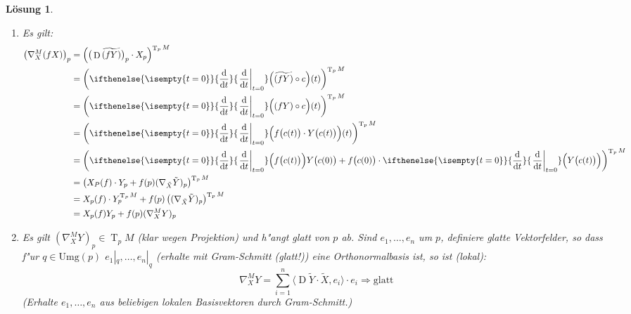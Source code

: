 \documentclass[paper=A4, twoside, chapterprefix=true, bibliography=totoc, headsepline]{scrbook}
\DeclareMathOperator{\D}{D} %
\DeclareMathOperator{\T}{T} %
\newcommand{\dop}{\mathrm{d}}
\newcommand{\difffrac}[3][]{\ifthenelse{\isempty{#1}}{\frac{\dop #2}{\dop #3}}{\left. \frac{\dop #2}{\dop #3} \right|_{#1}}}
\theoremstyle{plain}
\theoremstyle{nonumberplain}
\theoremstyle{empty}
\theoremstyle{break}
\newtheorem{Loes}{L\"osung}
\begin{document}
\begin{Loes}
\begin{enumerate}[label=(\arabic*.\arabic*)]
\begin{align*}
		&= \left( (\D \tilde Y)_p (f(p)X_p) \right)^{\T_pM}\\
		&= f(p) \left( (\D \tilde Y)_p X_p \right)^{\T_pM}\\
		&= f(p) \left( \nabla_X^M Y)_p \right)
	\end{align*}
\item[(2.2)]
	Es gilt:
	\begin{align*}
		\left( \nabla_X^M(fX) \right)_p &= \left( \big(\D\widetilde{(fY)}\big)_p \cdot X_p \right)^{\T_pM}\\
		&= \left( \difffrac[t=0]{}{t} \Big( \widetilde{(fY)} \circ c \Big) (t) \right)^{\T_pM}\\
		&= \left( \difffrac[t=0]{}{t} \Big( (fY) \circ c \Big) (t) \right)^{\T_pM}\\
		&= \left( \difffrac[t=0]{}{t} \Big( f\big(c(t)\big) \cdot Y\big(c(t)\big) \Big) (t) \right)^{\T_pM}\\
		&= \left( \difffrac[t=0]{}{t} \Big( f\big(c(t)\big) \Big) Y\big(c(0)\big) + f\big(c(0)\big) \cdot \difffrac[t=0]{}{t} \Big( Y\big(c(t)\big) \Big) \right)^{\T_pM}\\
		&= \left( X_P(f) \cdot Y_p + f(p)(\nabla_{\tilde X} \tilde Y)_p \right)^{\T_pM}\\
		&= X_p(f) \cdot Y_p^{\T_pM} + f(p)\left((\nabla_{\tilde X} \tilde Y)_p \right)^{\T_pM}\\
		&= X_p(f) Y_p + f(p)(\nabla_X^MY)_p
	\end{align*}
\item[(3)]
	Es gilt $(\nabla_X^MY)_p \in \T_pM$ (klar wegen Projektion) und h"angt glatt von $p$ ab. Sind $e_1, \ldots ,e_n$ um $p$, definiere glatte Vektorfelder, so dass f"ur $q \in \mathrm{Umg}(p)$ $e_1|_q, \ldots ,e_n|_q$ (erhalte mit Gram-Schmitt (glatt!)) eine Orthonormalbasis ist, so ist (lokal):
		\[ \nabla_X^M Y = \sum_{i=1}^n \langle \D \tilde Y \cdot \tilde X, e_i \rangle \cdot e_i \Rightarrow \text{glatt} \]
	(Erhalte $e_1,\ldots ,e_n$ aus beliebigen lokalen Basisvektoren durch Gram-Schmitt.)
\end{enumerate}
\end{Loes}
\end{document}
